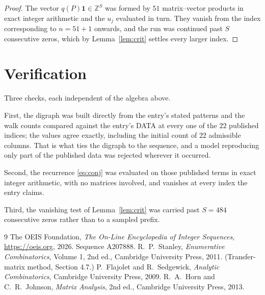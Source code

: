 \documentclass[11pt,a4paper]{article}
\theoremstyle{plain}
\theoremstyle{definition}
\begin{document}
\begin{proof}
The vector $q(P)\mathbf{1}\in\mathbb{Z}^{S}$ was formed by $51$ matrix--vector
products in exact integer arithmetic and the $u_j$ evaluated in turn. They vanish from the
index corresponding to $n=51+1$ onwards, and the run was continued past $S$ consecutive
zeros, which by Lemma~\ref{lem:crit} settles every larger index.
\end{proof}

\section{Verification}

Three checks, each independent of the algebra above.

First, the digraph was built directly from the entry's stated patterns and the walk counts
compared against the entry's DATA at every one of the $22$ published indices; the
values agree exactly, including the initial count of $22$ admissible columns. That is
what ties the digraph to the sequence, and a model reproducing only part of the published
data was rejected wherever it occurred.

Second, the recurrence \eqref{eq:conj} was evaluated on those published terms in exact
integer arithmetic, with no matrices involved, and vanishes at every index the entry claims.

Third, the vanishing test of Lemma~\ref{lem:crit} was carried past $S=484$ consecutive
zeros rather than to a sampled prefix.

\begin{thebibliography}{9}
 The OEIS Foundation, \emph{The On-Line Encyclopedia of Integer
Sequences}, \url{https://oeis.org}, 2026. Sequence A207888.
 R.~P.~Stanley, \emph{Enumerative Combinatorics}, Volume 1, 2nd ed.,
Cambridge University Press, 2011. (Transfer-matrix method, Section 4.7.)
 P.~Flajolet and R.~Sedgewick, \emph{Analytic Combinatorics}, Cambridge
University Press, 2009.
 R.~A.~Horn and C.~R.~Johnson, \emph{Matrix Analysis}, 2nd ed., Cambridge
University Press, 2013.
\end{thebibliography}
\end{document}
